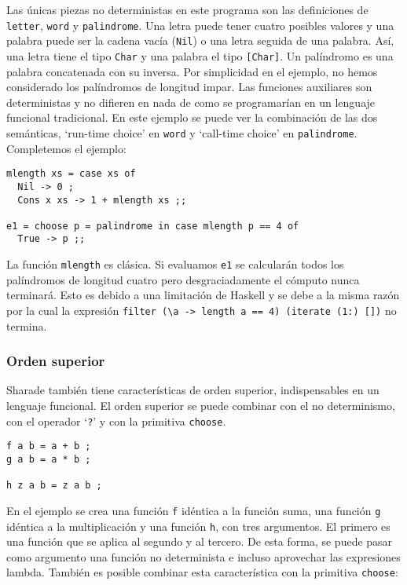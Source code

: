 \documentclass[class=article, crop=false]{standalone}
\begin{document}
Las únicas piezas no deterministas en este programa son las definiciones de \verb`letter`,
\verb`word` y \verb`palindrome`. Una letra puede tener cuatro posibles valores y una palabra
puede ser la cadena vacía (\verb`Nil`) o una letra seguida de una palabra. Así, una letra
tiene el tipo \verb`Char` y una palabra el tipo \verb`[Char]`. Un palíndromo es una palabra
concatenada con su inversa. Por simplicidad en el ejemplo, no hemos considerado los
palíndromos de longitud impar. Las funciones auxiliares son deterministas y no difieren en
nada de como se programarían en un lenguaje funcional tradicional. En este ejemplo se puede
ver la combinación de las dos semánticas, `run-time choice' en \verb`word` y `call-time
choice' en \verb`palindrome`. Completemos el ejemplo:

\begin{verbatim}
mlength xs = case xs of
  Nil -> 0 ;
  Cons x xs -> 1 + mlength xs ;;

e1 = choose p = palindrome in case mlength p == 4 of
  True -> p ;;
\end{verbatim}

La función \verb`mlength` es clásica. Si evaluamos \verb`e1` se calcularán todos los
palíndromos de longitud cuatro pero desgraciadamente el cómputo nunca terminará. Esto es
debido a una limitación de Haskell y se debe a la misma razón por la cual la expresión
\verb`filter (\a -> length a == 4) (iterate (1:) [])` no termina.

\subsubsection{Orden superior}

Sharade también tiene características de orden superior, indispensables en un lenguaje
funcional. El orden superior se puede combinar con el no determinismo, con el operador
`\verb`?`' y con la primitiva \verb`choose`.

\begin{verbatim}
f a b = a + b ;
g a b = a * b ;

h z a b = z a b ;
\end{verbatim}

En el ejemplo se crea una función \verb`f` idéntica a la función suma, una función \verb`g`
idéntica a la multiplicación y una función \verb`h`, con tres argumentos. El primero es una
función que se aplica al segundo y al tercero. De esta forma, se puede pasar como argumento
una función no determinista e incluso aprovechar las expresiones lambda. También es posible
combinar esta característica con la primitiva \verb`choose`:
\end{document}
